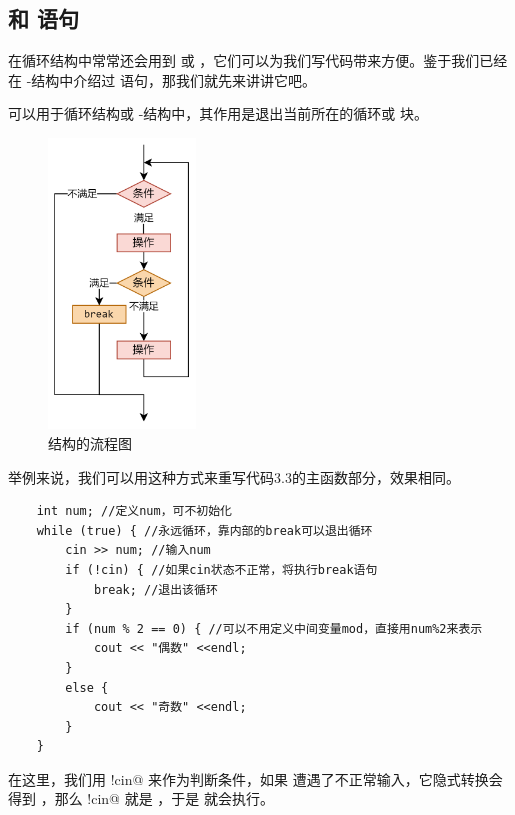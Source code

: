 \subsection*{\lstinline@continue@ 和 \lstinline@break@ 语句}
在循环结构中常常还会用到 \lstinline@continue@ 或 \lstinline@break@，它们可以为我们写代码带来方便。鉴于我们已经在 \lstinline@switch@-\lstinline@case@ 结构中介绍过 \lstinline@break@ 语句，那我们就先来讲讲它吧。\par
\lstinline@break@ 可以用于循环结构或 \lstinline@switch@-\lstinline@case@ 结构中，其作用是退出当前所在的循环或 \lstinline@switch@ 块。\par
\begin{figure}[htbp]
    \centering
    \includegraphics[width=0.35\textwidth]{../images/generalized_parts/03_structure_of_break_300.png}
    \caption{\lstinline@break@ 结构的流程图}
\end{figure}
举例来说，我们可以用这种方式来重写代码3.3的主函数部分，效果相同。
\begin{lstlisting}
    int num; //定义num，可不初始化
    while (true) { //永远循环，靠内部的break可以退出循环
        cin >> num; //输入num
        if (!cin) { //如果cin状态不正常，将执行break语句
            break; //退出该循环
        }
        if (num % 2 == 0) { //可以不用定义中间变量mod，直接用num%2来表示
            cout << "偶数" <<endl;
        }
        else {
            cout << "奇数" <<endl;
        }
    }
\end{lstlisting}
在这里，我们用 \lstinline@!cin@ 来作为判断条件，如果 \lstinline@cin@ 遭遇了不正常输入，它隐式转换会得到 \lstinline@false@，那么 \lstinline@!cin@ 就是 \lstinline@true@，于是 \lstinline@break@ 就会执行。\par
